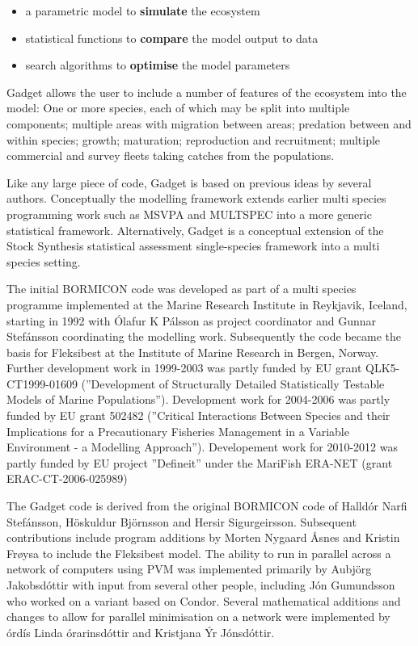 \documentclass[10pt,twoside]{book}
\begin{document}
\begin{itemize}
\item a parametric model to {\bf simulate} the ecosystem
\item statistical functions to {\bf compare} the model output to data
\item search algorithms to {\bf optimise} the model parameters
\end{itemize}

Gadget allows the user to include a number of features of the ecosystem into the model: One or more species, each of which may be split into multiple components; multiple areas with migration between areas; predation between and within species; growth; maturation; reproduction and recruitment; multiple commercial and survey fleets taking catches from the populations.

\bigskip
Like any large piece of code, Gadget is based on previous ideas by several authors.  Conceptually the modelling framework extends earlier multi species programming work such as MSVPA and MULTSPEC into a more generic statistical framework.  Alternatively, Gadget is a conceptual extension of the Stock Synthesis statistical assessment single-species framework into a multi species setting.

\bigskip
The initial BORMICON code was developed as part of a multi species programme implemented at the Marine Research Institute in Reykjavik, Iceland, starting in 1992 with \'{O}lafur K P\'{a}lsson as project coordinator and Gunnar Stef\'{a}nsson coordinating the modelling work.  Subsequently the code became the basis for Fleksibest at the Institute of Marine Research in Bergen, Norway.  Further development work in 1999-2003 was partly funded by EU grant QLK5-CT1999-01609 (''Development of Structurally Detailed Statistically Testable Models of Marine Populations'').  Development work for 2004-2006 was partly funded by EU grant 502482 (''Critical Interactions Between Species and their Implications for a Precautionary Fisheries Management in a Variable Environment - a Modelling Approach''). Developement work for 2010-2012 was partly funded by EU project ''Defineit'' under the MariFish ERA-NET (grant ERAC-CT-2006-025989)

\bigskip
The Gadget code is derived from the original BORMICON code of Halld\'{o}r Narfi Stef\'{a}nsson, H\"{o}skuldur Bj\"{o}rnsson and Hersir Sigurgeirsson.  Subsequent contributions include program additions by Morten Nygaard {\AA}snes and Kristin Fr{\o}ysa to include the Fleksibest model.  The ability to run in parallel across a network of computers using PVM was implemented primarily by Au{\dh}bj\"{o}rg Jakobsd\'{o}ttir with input from several other people, including J\'{o}n Gu{\dh}mundsson who worked on a variant based on Condor.  Several mathematical additions and changes to allow for parallel minimisation on a network were implemented by {\TH}\'{o}rd\'{i}s Linda {\TH}\'{o}rarinsd\'{o}ttir and Kristjana \'{Y}r J\'{o}nsd\'{o}ttir.
\end{document}
